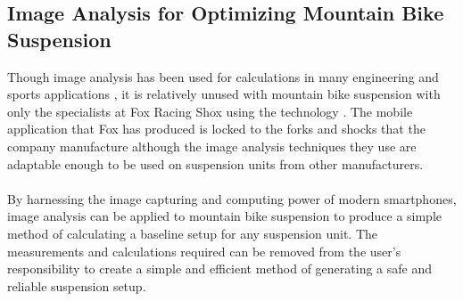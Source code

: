 \subsection{Image Analysis for Optimizing Mountain Bike Suspension}
	Though image analysis has been used for calculations in many engineering and sports applications \citep{concreteanalysis, bridgecables}, it is relatively unused with mountain bike suspension with only the specialists at Fox Racing Shox using the technology \citep{foxird}. The mobile application that Fox has produced is locked to the forks and shocks that the company manufacture although the image analysis techniques they use are adaptable enough to be used on suspension units from other manufacturers. 
	\\\\
	By harnessing the image capturing and computing power of modern smartphones, image analysis can be applied to mountain bike suspension to produce a simple method of calculating a baseline setup for any suspension unit. The measurements and calculations required can be removed from the user’s responsibility to create a simple and efficient method of generating a safe and reliable suspension setup.